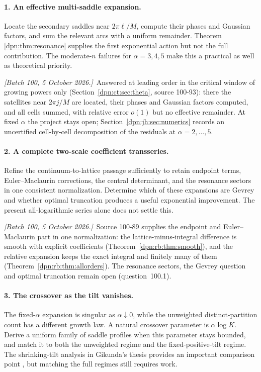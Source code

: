 \documentclass[11pt]{article}
\numberwithin{equation}{section}
\theoremstyle{definition}\newtheorem{definition}[theorem]{Definition}
\theoremstyle{remark}\newtheorem{remark}[theorem]{Remark}
\newcommand{\writenoted}[1]{\par\smallskip\noindent\textit{[Batch 100, 5 October 2026.]}\ #1\par\smallskip}
\begin{document}
\paragraph{1. An effective multi-saddle expansion.}
Locate the secondary saddles near $2\pi\ell/M$, compute their phases and
Gaussian factors, and sum the relevant arcs with a uniform remainder. Theorem
\ref{dpn:thm:resonance} supplies the first exponential action but not the full
contribution. The moderate-$n$ failures for $\alpha=3,4,5$ make this a practical
as well as theoretical priority.
\writenoted{Answered at leading order in the critical window of growing powers
only (Section~\ref{dpn:ct:sec:theta}, source 100-93): there the satellites near
$2\pi j/M$ are located, their phases and Gaussian factors computed, and all
cells summed, with relative error $o(1)$ but no effective remainder.  At fixed
$\alpha$ the project stays open; Section~\ref{dpn:jh:sec:numerics} records an
uncertified cell-by-cell decomposition of the residuals at $\alpha=2,\dots,5$.}

\paragraph{2. A complete two-scale coefficient transseries.}
Refine the continuum-to-lattice passage sufficiently to retain endpoint terms,
Euler--Maclaurin corrections, the central determinant, and the resonance
sectors in one consistent normalization. Determine which of these expansions
are Gevrey and whether optimal truncation produces a useful exponential
improvement. The present all-logarithmic series alone does not settle this.
\writenoted{Source 100-89 supplies the endpoint and Euler--Maclaurin part in
one normalization: the lattice-minus-integral difference is smooth with
explicit coefficients (Theorem~\ref{dpn:rb:thm:smooth}), and the relative
expansion keeps the exact integral and finitely many of them
(Theorem~\ref{dpn:rb:thm:allorders}).  The resonance sectors, the Gevrey
question and optimal truncation remain open (question~100.1).}

\paragraph{3. The crossover as the tilt vanishes.}
The fixed-$\alpha$ expansion is singular as $\alpha\downarrow0$, while the
unweighted distinct-partition count has a different growth law. A natural
crossover parameter is $\alpha\log K$. Derive a uniform family of saddle
profiles when this parameter stays bounded, and match it to both the
unweighted regime and the fixed-positive-tilt regime. The shrinking-tilt
analysis in Gikunda's thesis provides an important comparison point
\cite{gikunda}, but matching the full regimes still requires work.
\end{document}

